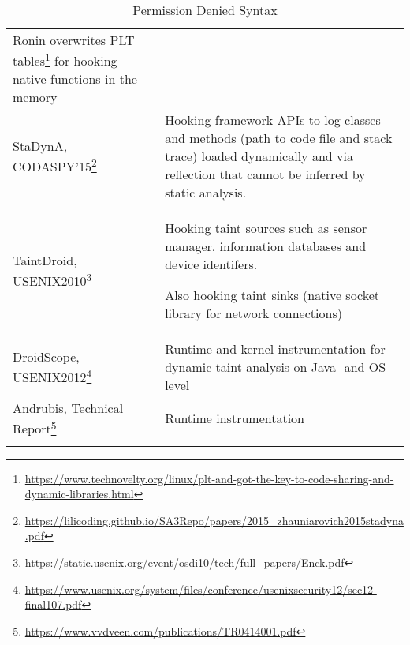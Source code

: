 \begin{longtable}{p{.3\linewidth}p{.7\linewidth}}
Ronin overwrites PLT tables\footnote{\url{https://www.technovelty.org/linux/plt-and-got-the-key-to-code-sharing-and-dynamic-libraries.html}}  for hooking native functions in the memory
\\

StaDynA, CODASPY'15\footnote{\url{https://lilicoding.github.io/SA3Repo/papers/2015_zhauniarovich2015stadyna.pdf}}
& Hooking framework APIs to log classes and methods (path to code file and stack trace) loaded dynamically and via reflection that cannot be inferred by static analysis.
\\

TaintDroid, USENIX2010\footnote{\url{https://static.usenix.org/event/osdi10/tech/full_papers/Enck.pdf}}
&Hooking taint sources such as sensor manager, information databases and device identifers.

Also hooking taint sinks (native socket library for network connections)
\\

DroidScope, USENIX2012\footnote{\url{https://www.usenix.org/system/files/conference/usenixsecurity12/sec12-final107.pdf}}
& Runtime and kernel instrumentation for dynamic taint analysis on Java- and OS-level
\\

Andrubis, Technical Report\footnote{\url{https://www.vvdveen.com/publications/TR0414001.pdf}}
& Runtime instrumentation
\\

\midrule
\caption{Permission Denied Syntax} 
\label{tab:permissiondeniedsyntax}
\end{longtable}

